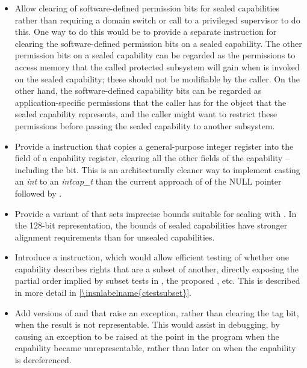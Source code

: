 \begin{itemize}
\item
  Allow clearing of software-defined permission bits for sealed
  capabilities rather than requiring a domain switch or call to a privileged
  supervisor to do this.
  One way to do this would be to provide a separate instruction for clearing
  the software-defined permission bits
  on a sealed capability. The other permission bits on a sealed capability
  can be regarded as the permissions to access memory that the called protected
  subsystem will gain when  is invoked on the sealed
  capability; these should not be modifiable by the caller. On the other hand,
  the software-defined capability bits can be regarded as application-specific
  permissions that the caller has for the object that the sealed capability
  represents, and the caller might want to restrict these permissions before
  passing the sealed capability to another subsystem.

\item
  Provide a  instruction that copies a
  general-purpose integer register into the \coffset{} field of a capability register,
clearing all the other fields of the capability -- including the \ctag{} bit.
  This is an architecturally cleaner way to implement casting an
  \emph{int} to an \emph{intcap\_t} than the current approach of
   of the NULL pointer followed by
  .

\item
  Provide a variant of  that sets imprecise bounds
  suitable for sealing with . In the 128-bit
  representation, the bounds of sealed capabilities have stronger alignment
  requirements than for unsealed capabilities.

\item Introduce a  instruction, which would allow
  efficient testing of whether one capability describes rights that are a
  subset of another, directly exposing the partial order implied by subset
  tests in , the proposed , etc.
  This is described in more detail in \cref{\insnlabelname{ctestsubset}}.
  
\item
  Add versions of  and 
  that raise an exception, rather than clearing the tag bit, when the result
  is not representable. This would assist in debugging, by causing an
  exception to be raised at the point in the program when the capability
  became unrepresentable, rather than later on when the capability is
  dereferenced.


\end{itemize}
